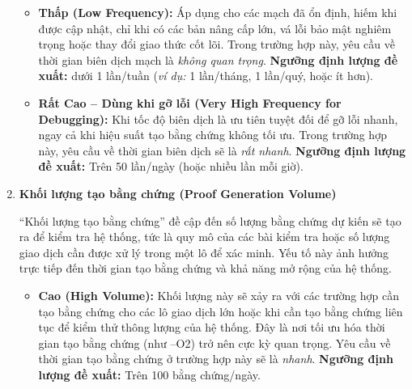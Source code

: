 \begin{enumerate}
\begin{itemize}

        \item \textbf{Thấp (Low Frequency):} Áp dụng cho các mạch đã ổn định, hiếm khi được cập nhật, chỉ khi có các bản nâng cấp lớn, vá lỗi bảo mật nghiêm trọng hoặc thay đổi giao thức cốt lõi. Trong trường hợp này, yêu cầu về thời gian biên dịch mạch là \textit{không quan trọng}. \textbf{Ngưỡng định lượng đề xuất:} dưới 1 lần/tuần (\textit{ví dụ:} 1 lần/tháng, 1 lần/quý, hoặc ít hơn).


        \item \textbf{Rất Cao -- Dùng khi gỡ lỗi (Very High Frequency for Debugging):} Khi tốc độ biên dịch là ưu tiên tuyệt đối để gỡ lỗi nhanh, ngay cả khi hiệu suất tạo bằng chứng không tối ưu. Trong trường hợp này, yêu cầu về thời gian biên dịch sẽ là \textit{rất nhanh}. \textbf{Ngưỡng định lượng đề xuất:} Trên 50 lần/ngày (hoặc nhiều lần mỗi giờ).

    \end{itemize}
    
    \item \textbf{Khối lượng tạo bằng chứng (Proof Generation Volume)}

    ``Khối lượng tạo bằng chứng'' đề cập đến số lượng bằng chứng dự kiến sẽ tạo ra để kiểm tra hệ thống, tức là quy mô của các bài kiểm tra hoặc số lượng giao dịch cần được xử lý trong một lô để xác minh. Yếu tố này ảnh hưởng trực tiếp đến thời gian tạo bằng chứng và khả năng mở rộng của hệ thống.


    \begin{itemize}
    
    \item \textbf{Cao (High Volume):} Khối lượng này sẽ xảy ra với các trường hợp cần tạo bằng chứng cho các lô giao dịch lớn hoặc khi cần tạo bằng chứng liên tục để kiểm thử thông lượng của hệ thống. Đây là nơi tối ưu hóa thời gian tạo bằng chứng (như --O2) trở nên cực kỳ quan trọng. Yêu cầu về thời gian tạo bằng chứng ở trường hợp này sẽ là \textit{nhanh}. \textbf{Ngưỡng định lượng đề xuất:} 
    Trên 100 bằng chứng/ngày.
    

\end{itemize}
\end{enumerate}
